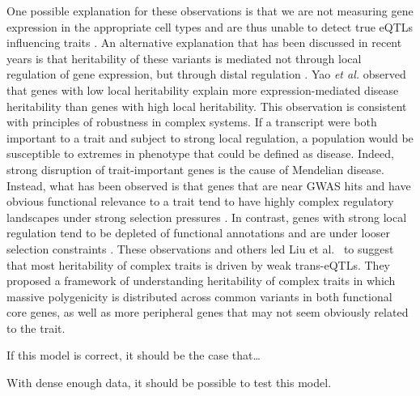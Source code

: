 \documentclass[
]{article}
\begin{document}
One possible explanation for these observations is that we are not
measuring gene expression in the appropriate cell types and are thus
unable to detect true eQTLs influencing traits \cite{pmid32912663}. An
alternative explanation that has been discussed in recent years is that
heritability of these variants is mediated not through local regulation
of gene expression, but through distal regulation
\cite{pmid37857933, pmid32424349}. Yao \textit{et al.}
\cite{pmid32424349} observed that genes with low local heritability
explain more expression-mediated disease heritability than genes with
high local heritability. This observation is consistent with principles
of robustness in complex systems. If a transcript were both important to
a trait and subject to strong local regulation, a population would be
susceptible to extremes in phenotype that could be defined as disease.
Indeed, strong disruption of trait-important genes is the cause of
Mendelian disease. Instead, what has been observed is that genes that
are near GWAS hits and have obvious functional relevance to a trait tend
to have highly complex regulatory landscapes under strong selection
pressures \cite{pmid37857933}. In contrast, genes with strong local
regulation tend to be depleted of functional annotations and are under
looser selection constraints \cite{pmid37857933}. These observations and
others led Liu et al.~\cite{pmid31051098} to suggest that most
heritability of complex traits is driven by weak trans-eQTLs. They
proposed a framework of understanding heritability of complex traits in
which massive polygenicity is distributed across common variants in both
functional core genes, as well as more peripheral genes that may not
seem obviously related to the trait.

If this model is correct, it should be the case that\ldots{}

With dense enough data, it should be possible to test this model.
\end{document}
